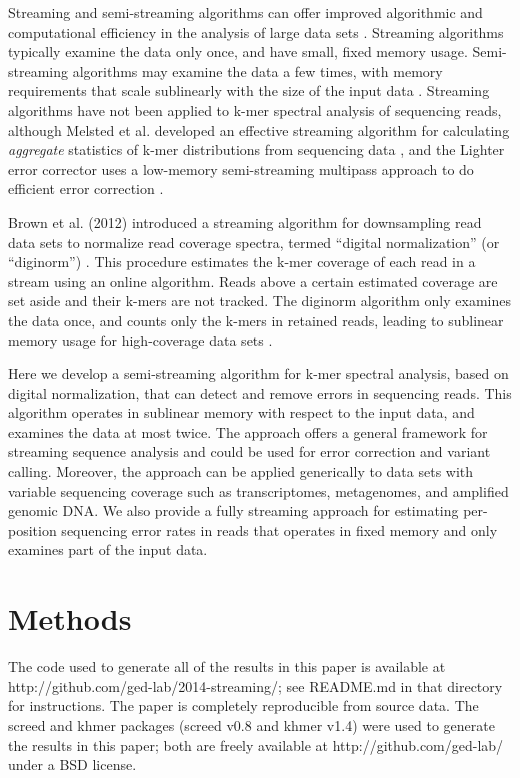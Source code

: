 \documentclass{article}
\begin{document}
Streaming and semi-streaming algorithms can offer improved algorithmic
and computational efficiency in the analysis of large data sets
\cite{Charikar2004, Cormode2005}.  Streaming algorithms typically
examine the data only once, and have small, fixed memory usage.
Semi-streaming algorithms may examine the data a few times, with
memory requirements that scale sublinearly with the size of the input
data \cite{Feigenbaum2005}.  Streaming algorithms have not been
applied to k-mer spectral analysis of sequencing reads, although
Melsted et al. developed an effective streaming algorithm for
calculating {\em aggregate} statistics of k-mer distributions from
sequencing data \cite{Melsted2014}, and the Lighter error corrector
uses a low-memory semi-streaming multipass approach to do efficient
error correction \cite{lighter}.

Brown et al. (2012) introduced a streaming algorithm for downsampling
read data sets to normalize read coverage spectra, termed ``digital
normalization'' (or ``diginorm'') \cite{Brown2012}.  This procedure
estimates the k-mer coverage of each read in a stream using an online
algorithm. Reads above a certain estimated coverage are set aside and
their k-mers are not tracked.  The diginorm algorithm only examines
the data once, and counts only the k-mers in retained reads, leading
to sublinear memory usage for high-coverage data sets
\cite{Brown2012}.

Here we develop a semi-streaming algorithm for k-mer spectral
analysis, based on digital normalization, that can detect and remove
errors in sequencing reads.  This algorithm operates in sublinear
memory with respect to the input data, and examines the data at most
twice.  The approach offers a general framework for streaming sequence
analysis and could be used for error correction and variant calling.
Moreover, the approach can be applied generically to data sets with
variable sequencing coverage such as transcriptomes, metagenomes, and
amplified genomic DNA.  We also provide a fully streaming approach for
estimating per-position sequencing error rates in reads that operates
in fixed memory and only examines part of the input data.

\section{Methods}

The code used to generate all of the results in this paper is
available at http://github.com/ged-lab/2014-streaming/; see README.md
in that directory for instructions.  The paper is completely
reproducible from source data.  The screed and khmer packages (screed
v0.8 and khmer v1.4) were used to generate the results in this paper;
both are freely available at http://github.com/ged-lab/ under a BSD
license.
\end{document}
